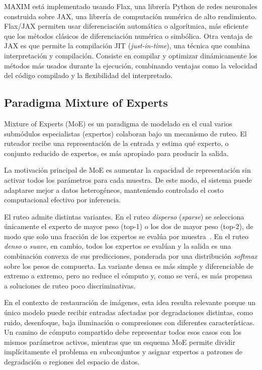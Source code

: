 \documentclass[aps,prl,twocolumn,groupedaddress]{revtex4-2}
\begin{document}
MAXIM está implementado usando Flax, una librería Python de redes neuronales construida sobre JAX, una librería de computación numérica de alto rendimiento. Flax/JAX permiten usar diferenciación automática o algorítmica, más eficiente que los métodos clásicos de diferenciación numérica o simbólica. Otra ventaja de JAX es que permite la compilación JIT (\textit{just-in-time}), una técnica que combina interpretación y compilación. Consiste en compilar y optimizar dinámicamente los métodos más usados durante la ejecución, combinando ventajas como la velocidad del código compilado y la flexibilidad del interpretado.


\subsection{Paradigma Mixture of Experts}

Mixture of Experts (MoE) es un paradigma de modelado en el cual varios submódulos especialistas (expertos) colaboran bajo un mecanismo de ruteo. El ruteador recibe una representación de la entrada y estima qué experto, o conjunto reducido de expertos, es más apropiado para producir la salida.

La motivación principal de MoE es aumentar la capacidad de representación sin activar todos los parámetros para cada muestra. De este modo, el sistema puede adaptarse mejor a datos heterogéneos, manteniendo controlado el costo computacional efectivo por inferencia.

El ruteo admite distintas variantes. En el ruteo \textit{disperso} (\textit{sparse}) se selecciona únicamente el experto de mayor peso (top-1) o los dos de mayor peso (top-2), de modo que solo una fracción de los expertos se evalúa por muestra~\cite{shazeer2017moe,fedus2022switch}. En el ruteo \textit{denso} o \textit{suave}, en cambio, todos los expertos se evalúan y la salida es una combinación convexa de sus predicciones, ponderada por una distribución \textit{softmax} sobre los pesos de compuerta. La variante densa es más simple y diferenciable de extremo a extremo, pero no reduce el cómputo y, como se verá, es más propensa a soluciones de ruteo poco discriminativas.

En el contexto de restauración de imágenes, esta idea resulta relevante porque un único modelo puede recibir entradas afectadas por degradaciones distintas, como ruido, desenfoque, baja iluminación o compresiones con diferentes características. Un camino de cómputo compartido debe representar todos esos casos con los mismos parámetros activos, mientras que un esquema MoE permite dividir implícitamente el problema en subconjuntos y asignar expertos a patrones de degradación o regiones del espacio de datos.
\end{document}
